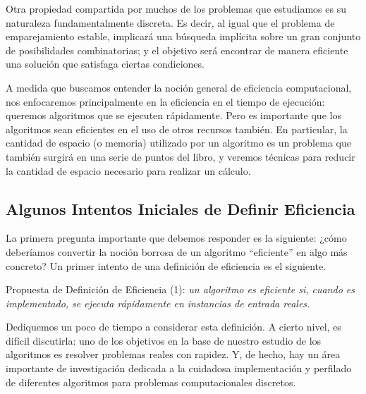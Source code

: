 \documentclass[a4paper, 12pt]{book}
\begin{document}
Otra propiedad compartida por muchos de los problemas que estudiamos es su naturaleza fundamentalmente discreta. Es decir, al igual que el problema de emparejamiento estable, implicará una búsqueda implícita sobre un gran conjunto de posibilidades combinatorias; y el objetivo será encontrar de manera eficiente una solución que satisfaga ciertas condiciones.

A medida que buscamos entender la noción general de eficiencia computacional, nos enfocaremos principalmente en la eficiencia en el tiempo de ejecución: queremos algoritmos que se ejecuten rápidamente. Pero es importante que los algoritmos sean eficientes en el uso de otros recursos también. En particular, la cantidad de espacio (o memoria) utilizado por un algoritmo es un problema que también surgirá en una serie de puntos del libro, y veremos técnicas para reducir la cantidad de espacio necesario para realizar un cálculo.

\subsection*{Algunos Intentos Iniciales de Definir Eficiencia}

La primera pregunta importante que debemos responder es la siguiente: ¿cómo deberíamos convertir la noción borrosa de un algoritmo ``eficiente'' en algo más concreto? 
Un primer intento de una definición de eficiencia es el siguiente. 

\vspace{18pt}
Propuesta de Definición de Eficiencia (1): \textit{un algoritmo es eficiente si, cuando es implementado, se ejecuta rápidamente en instancias de entrada reales.}
\vspace{18pt}

Dediquemos un poco de tiempo a considerar esta definición. A cierto nivel, es difícil discutirla: uno de los objetivos en la base de nuestro estudio de los algoritmos es resolver problemas reales con rapidez. Y, de hecho, hay un área importante de investigación dedicada a la cuidadosa implementación y perfilado de diferentes algoritmos para problemas computacionales discretos.
\end{document}
